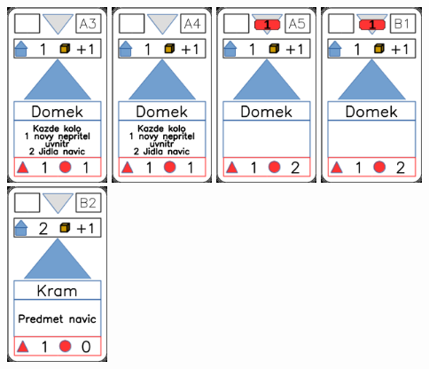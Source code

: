 \documentclass[a4paper]{article}
\begin{document}
	\includegraphics[width=3.0cm]{img-2_2}
	\includegraphics[width=3.0cm]{img-2_3}
	\includegraphics[width=3.0cm]{img-2_4}
	\includegraphics[width=3.0cm]{img-2_5}
	\includegraphics[width=3.0cm]{img-2_6}
\end{document}
